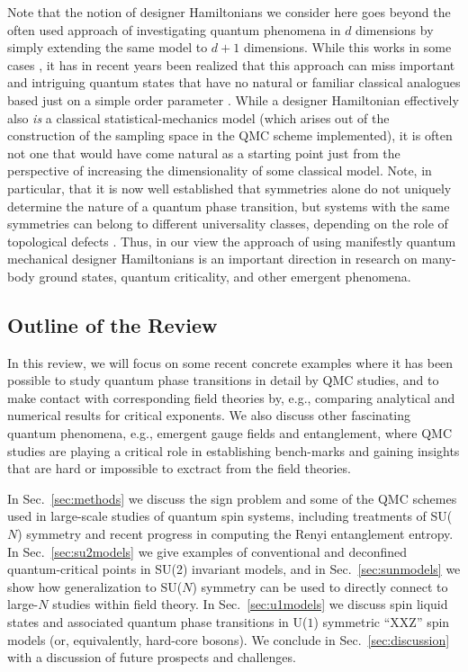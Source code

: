 \documentclass[range]{ar2e}
\begin{document}
Note that the notion of designer Hamiltonians we consider here goes beyond the often used approach of investigating quantum phenomena 
in $d$ dimensions by simply extending the same model to $d+1$ dimensions. While this works in some cases \cite{Rieger94,Sorensen92,Nahum11}, 
it has in recent years been realized that this approach can miss important and intriguing quantum states that have no natural or familiar 
classical analogues based just on a simple order parameter \cite{Senthil04a,Fradkin04,Sachdev08}. While a designer Hamiltonian effectively also {\it is} 
a classical statistical-mechanics model (which arises out of the construction of the sampling space in the QMC scheme implemented), it is 
often not one that would have come natural as a starting point just from the perspective of increasing the dimensionality of some
classical model. Note, in particular, that it is now well established that symmetries alone do not uniquely determine the nature of a 
quantum phase transition, but systems with the same symmetries can belong to different universality classes, depending on the role of topological 
defects \cite{Motrunich04}. Thus, in our view the approach of using manifestly quantum mechanical designer Hamiltonians is an important direction
in research on many-body ground states, quantum criticality, and other emergent phenomena.

\subsection{Outline of the Review}

In this review, we will focus on some recent concrete examples where it has been possible to study quantum phase transitions in detail 
by QMC studies, and to make contact with corresponding field theories by, e.g., comparing analytical and numerical results for critical 
exponents. We also discuss other fascinating quantum phenomena, e.g., emergent gauge fields and entanglement, where QMC studies are
playing a critical role in establishing bench-marks and gaining insights that are hard or impossible to exctract from the field theories.

In Sec.~\ref{sec:methods} we discuss the sign problem and some of the QMC schemes used in large-scale studies of quantum spin systems, 
including treatments of SU($N$) symmetry and recent progress in computing the Renyi entanglement entropy. In Sec.~\ref{sec:su2models} 
we give examples of conventional and deconfined quantum-critical points in SU(2) invariant models, and in Sec.~\ref{sec:sunmodels} 
we show how generalization to SU($N$) symmetry can be used to directly connect to large-$N$ studies within field theory. In Sec.~\ref{sec:u1models} 
we discuss spin liquid states and associated quantum phase transitions in U($1$) symmetric ``XXZ'' spin models (or, equivalently, hard-core bosons). 
We conclude in Sec.~\ref{sec:discussion} with a discussion of future prospects and challenges.
\end{document}
